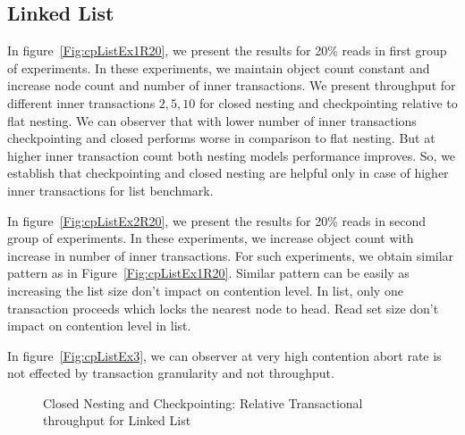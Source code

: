 \documentclass[12pt,english]{report}
\begin{document}
\subsection{Linked List}
In figure~\ref{Fig:cpListEx1R20}, we present the results for 20\% reads in first group of experiments. In these experiments, we maintain object count constant and increase node count and number of inner transactions. We present throughput for different inner transactions ${2, 5, 10}$ for closed nesting and checkpointing relative to flat nesting. We can observer that with lower number of inner transactions checkpointing and closed performs worse in comparison to flat nesting. But at higher inner transaction count both nesting models performance improves. So, we establish that checkpointing and closed nesting are helpful only in case of higher inner transactions for list benchmark.

In figure~\ref{Fig:cpListEx2R20}, we present the results for 20\% reads in second group of experiments. In these experiments, we increase object count with increase in number of inner transactions. For such experiments, we obtain similar pattern as in Figure~\ref{Fig:cpListEx1R20}. Similar pattern can be easily as increasing the list size don't impact on contention level. In list, only one transaction proceeds which locks the nearest node to head. Read set size don't impact on contention level in list.

In figure~\ref{Fig:cpListEx3}, we can observer at very high contention abort rate is not effected by transaction granularity and not throughput.

\begin{figure}[H]
\centering
{}
\end{figure}
\begin{figure}[H]
\centering
{}
\end{figure}
\begin{figure}[H]
\centering
{}
\caption{Closed Nesting and Checkpointing: Relative Transactional throughput for Linked List}
\label{Fig:cpList}
\end{figure}
\end{document}
